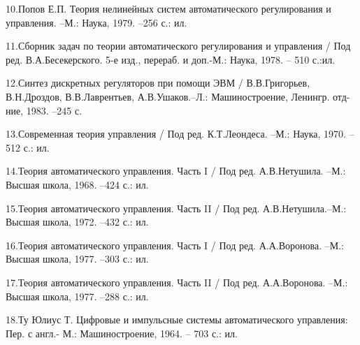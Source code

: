 \documentclass[a4paper]{article}
\begin{document}
{\begin{russian}
\textsf{10.Попов Е.П. Теория нелинейных систем автоматического регулирования и управления. –М.: Наука, 1979. –256 с.:
ил.}
\end{russian}}

{\begin{russian}
\textsf{11.Сборник задач по теории автоматического регулирования и управления / Под ред. В.А.Бесекерского. 5-е изд.,
перераб. и доп.-М.: Наука, 1978. – 510 с.:ил.}
\end{russian}}

{\begin{russian}
\textsf{12.Синтез дискретных регуляторов при помощи ЭВМ / В.В.Григорьев, В.Н.Дроздов, В.В.Лаврентьев, А.В.Ушаков.–Л.:
Машиностроение, Ленингр. отд-ние, 1983. –245 с.}
\end{russian}}

{\begin{russian}
\textsf{13.Современная теория управления / Под ред. К.Т.Леондеса. –М.: Наука, 1970. –512 с.: ил. \ \ }
\end{russian}}

{\begin{russian}
\textsf{14.Теория автоматического управления. Часть }\textenglish{\textsf{I}}\textsf{ / Под ред. А.В.Нетушила. –М.:
Высшая школа, 1968. –424 с.: ил.}
\end{russian}}

{\begin{russian}
\textsf{15.Теория автоматического управления. Часть }\textenglish{\textsf{II}}\textsf{ / Под ред. А.В.Нетушила.–М.:
Высшая школа, 1972. –432 с.: ил.}
\end{russian}}

{\begin{russian}
\textsf{16.Теория автоматического управления. Часть }\textenglish{\textsf{I}}\textsf{ / Под ред. А.А.Воронова. –М.:
Высшая школа, 1977. –303 с.: ил.}
\end{russian}}

{\begin{russian}
\textsf{17.Теория автоматического управления. Часть }\textenglish{\textsf{II}}\textsf{ / Под ред. А.А.Воронова. –М.:
Высшая школа, 1977. –288 с.: ил.}
\end{russian}}

{\begin{russian}\sffamily
18.Ту Юлиус Т. Цифровые и импульсные системы автоматического управления: Пер. с англ.- М.: Машиностроение, 1964. – 703
с.: ил.
\end{russian}}
\end{document}
